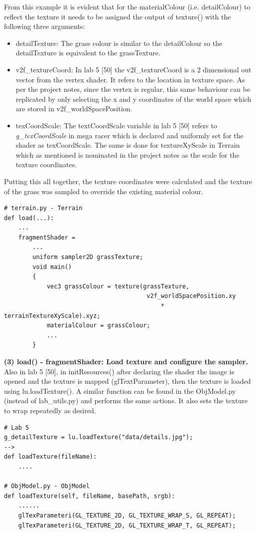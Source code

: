 \documentclass[a4 paper, 12pt]{article}
\begin{document}
From this example it is evident that for the materialColour (i.e. detailColour) to reflect the texture it needs to be assigned the output of texture() with the following three arguments:
    \begin{itemize}
        \item detailTexture: The grass colour is similar to the detailColour so the detailTexture is equivalent to the grassTexture.
        \item v2f\_textureCoord: In lab 5 [50] the v2f\_textureCoord is a 2 dimensional out vector from the vertex shader. It refers to the location in texture space. As per the project notes, since the vertex is regular, this same behaviour can be replicated by only selecting the x and y coordinates of the world space which are stored in v2f\_worldSpacePosition.
        \item texCoordScale: The textCoordScale variable in lab 5 [50] refers to \textit{g\_texCoordScale} in mega racer which is declared and uniformly set for the shader as texCoordScale. The same is done for textureXyScale in Terrain which as mentioned is nominated in the project notes as the scale for the texture coordinates.
    \end{itemize}

Putting this all together, the texture coordinates were calculated and the texture of the grass was sampled to override the existing material colour.
    \begin{lstlisting}
# terrain.py - Terrain
def load(...):
    ...
    fragmentShader =
        ...
        uniform sampler2D grassTexture; 
        void main()
        {
            vec3 grassColour = texture(grassTexture, 
                                        v2f_worldSpacePosition.xy 
                                            * terrainTextureXyScale).xyz;
            materialColour = grassColour;
            ...
        }
    \end{lstlisting}

\textbf{(3) load() - fragmentShader: Load texture and configure the sampler.} \\
Also in lab 5 [50], in initResources() after declaring the shader the image is opened and the texture is mapped (glTextParameter), then the texture is loaded using lu.loadTexture(). A similar function can be found in the ObjModel.py (instead of lab\_utils.py) and performs the same actions. It also sets the texture to wrap repeatedly as desired.
    \begin{lstlisting}  
# Lab 5 
g_detailTexture = lu.loadTexture("data/details.jpg");
--> 
def loadTexture(fileName): 
    ....

# ObjModel.py - ObjModel
def loadTexture(self, fileName, basePath, srgb):
    ......
    glTexParameteri(GL_TEXTURE_2D, GL_TEXTURE_WRAP_S, GL_REPEAT);
    glTexParameteri(GL_TEXTURE_2D, GL_TEXTURE_WRAP_T, GL_REPEAT);
    \end{lstlisting}
\end{document}
